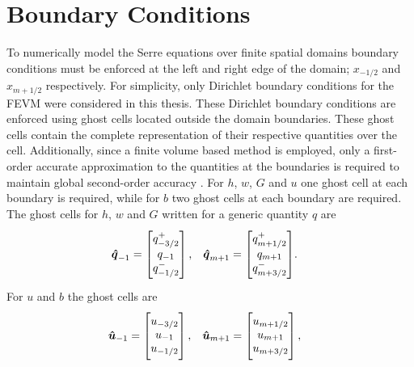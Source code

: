 \section{Boundary Conditions}
To numerically model the Serre equations over finite spatial domains boundary conditions must be enforced at the left and right edge of the domain; $x_{-1/2}$ and $x_{m+1/2}$ respectively. For simplicity, only Dirichlet boundary conditions for the FEVM were considered in this thesis. These Dirichlet boundary conditions are enforced using ghost cells located outside the domain boundaries. These ghost cells contain the complete representation of their respective quantities over the cell. Additionally, since a finite volume based method is employed, only a first-order accurate approximation to the quantities at the boundaries is required to maintain global second-order accuracy \cite{Gustafsson}. For $h$, $w$, $G$ and $u$ one ghost cell at each boundary is required, while for $b$ two ghost cells at each boundary are required. The ghost cells for $h$, $w$ and $G$ written for a generic quantity $q$ are
\begin{align*}
&\vecn{\hat{q}}_{-1} = \begin{bmatrix} \TM
q^+_{-3/2} \\ q_{-1} \\ q^-_{-1/2} \BM \end{bmatrix},&\vecn{\hat{q}}_{m+1} = \begin{bmatrix} \TM
q^+_{m+1/2} \\ q_{m+1} \\q^-_{m+3/2} \BM\end{bmatrix}&.
\end{align*}
For $u$ and $b$ the ghost cells are
\begin{align*}
&\vecn{\hat{u}}_{-1} = \begin{bmatrix}\TM
u_{-3/2} \\ u_{-1} \\ u_{-1/2} \BM\end{bmatrix},&\vecn{\hat{u}}_{m+1} = \begin{bmatrix}\TM
u_{m+1/2} \\ u_{m+1} \\ u_{m+3/2} \BM\end{bmatrix},&
\end{align*}

